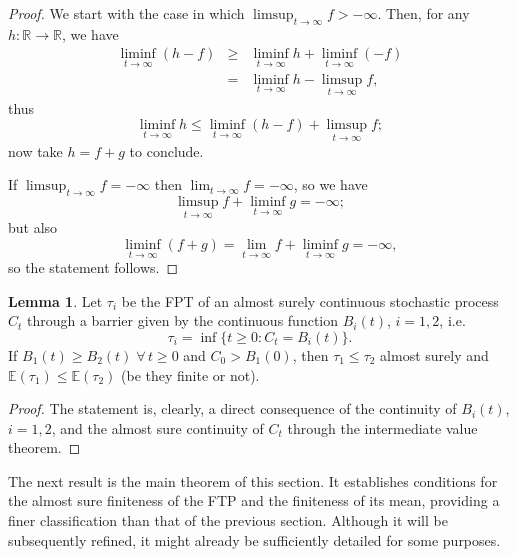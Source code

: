 \documentclass[12pt]{article}
\theoremstyle{definition}
\newtheorem{lemma}{Lemma}[theorem]
\begin{document}
\begin{proof}
We start with the case in which $\limsup_{t \to \infty} f > -\infty$.
Then, for any $h:\mathbb{R} \longrightarrow \mathbb{R}$, we have
\begin{eqnarray}\nonumber
\liminf_{t \to \infty} (h-f) &\ge& \liminf_{t \to \infty} h + \liminf_{t \to \infty} (-f) \\ \nonumber
&=& \liminf_{t \to \infty} h - \limsup_{t \to \infty} f,
\end{eqnarray}
thus
$$\nonumber
\liminf_{t \to \infty} h \le \liminf_{t \to \infty} (h-f) + \limsup_{t \to \infty} f;
$$
now take $h=f+g$ to conclude.

If $\limsup_{t \to \infty} f = -\infty$ then $\lim_{t \to \infty} f = -\infty$, so we have
$$
\limsup_{t \to \infty} f + \liminf_{t \to \infty} g =-\infty;
$$
but also
$$\nonumber
\liminf_{t \to \infty} (f+g) = \lim_{t \to \infty} f + \liminf_{t \to \infty} g = -\infty,
$$
so the statement follows.
\end{proof}

\begin{lemma}
\label{lemma:rem2barriers}
Let $\tau_i$ be the FPT of an almost surely continuous stochastic process $C_t$ through a barrier given by the continuous function $B_i(t)$, $i=1,2$, i.e. 
$$
\tau_i = \inf \{t \ge 0 : C_t = B_i(t)\}.
$$
If $B_1(t) \geq B_2(t)\;\forall \, t \geq 0$ and $C_0 > B_1(0)$, then $\tau_1 \leq \tau_2$ almost surely and $\mathbb{E}(\tau_1) \leq \mathbb{E}(\tau_2)$ (be they finite or not). 
\end{lemma}

\begin{proof}
The statement is, clearly, a direct consequence of the continuity of $B_i(t)$, $i=1,2$, and the almost sure continuity of $C_t$ through the intermediate value theorem.
\end{proof}

The next result is the main theorem of this section. It establishes conditions for the almost sure finiteness of the FTP and the finiteness of its mean, providing a finer classification than that of the previous section. Although it will be subsequently refined, it might already be sufficiently detailed for some purposes.
\end{document}
